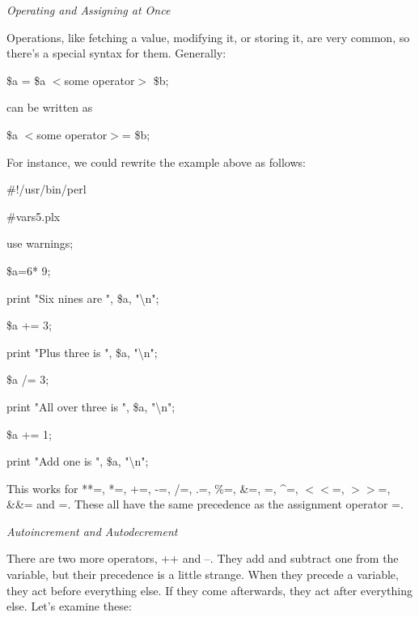 \documentclass[a4paper,11pt]{book}
\begin{document}
\noindent 

\noindent \textit{Operating and Assigning at Once}

\noindent Operations, like fetching a value, modifying it, or storing it, are very common, so there's a special syntax for them. Generally:

\noindent 

\noindent 

\noindent \$a = \$a $<$some operator$>$ \$b;

\noindent 

\noindent can be written as

\noindent 

\noindent 

\noindent \$a $<$some operator$>$= \$b;

\noindent 

\noindent For instance, we could rewrite the example above as follows:

\noindent 

\noindent 

\noindent \#!/usr/bin/perl

\noindent \#vars5.plx

\noindent use warnings;

\noindent \$a=6* 9;

\noindent print "Six nines are ", \$a, "\textbackslash n";

\noindent \$a += 3;

\noindent print "Plus three is ", \$a, "\textbackslash n";

\noindent \$a /= 3;

\noindent print "All over three is ", \$a, "\textbackslash n";

\noindent \$a += 1;

\noindent print "Add one is ", \$a, "\textbackslash n";

\noindent 

\noindent This works for **=, *=, +=, -=, /=, .=, \%=, \&=, \textbar =, \^{}=, $<$$<$=, $>$$>$=, \&\&= and \textbar \textbar =. These all have the same precedence as the assignment operator =.

\noindent 

\noindent 

\noindent \textit{Autoincrement and Autodecrement}

\noindent There are two more operators, ++ and --. They add and subtract one from the variable, but their precedence is a little strange. When they precede a variable, they act before everything else. If they come afterwards, they act after everything else. Let's examine these:
\end{document}
